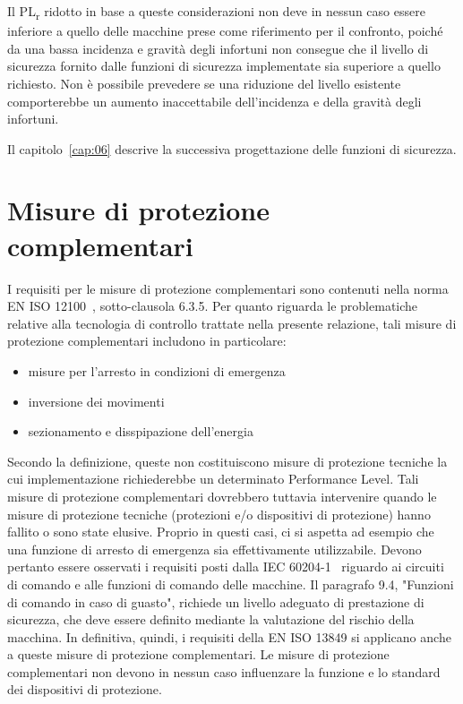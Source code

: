 Il PL\textsubscript{\small r} ridotto in base a queste considerazioni non deve in nessun caso essere inferiore a quello delle macchine prese come riferimento per il confronto, poiché da una bassa incidenza e gravità degli infortuni non consegue che il livello di sicurezza fornito dalle funzioni di sicurezza implementate sia superiore a quello richiesto. Non è possibile prevedere se una riduzione del livello esistente comporterebbe un aumento inaccettabile dell'incidenza e della gravità degli infortuni.

Il capitolo~\ref{cap:06} descrive la successiva progettazione delle funzioni di sicurezza.

\section{Misure di protezione complementari}
\label{sec:05-5}
I requisiti per le misure di protezione complementari sono contenuti nella norma EN ISO 12100~\cite{eniso12100}, sotto-clausola 6.3.5. Per quanto riguarda le problematiche relative alla tecnologia di controllo trattate nella presente relazione, tali misure di protezione complementari includono in particolare:

\begin{itemize}
    \item misure per l'arresto in condizioni di emergenza
    \item inversione dei movimenti
    \item sezionamento e disspipazione dell'energia
\end{itemize}

Secondo la definizione, queste non costituiscono misure di protezione tecniche la cui implementazione richiederebbe un determinato Performance Level. Tali misure di protezione complementari dovrebbero tuttavia intervenire quando le misure di protezione tecniche (protezioni e/o dispositivi di protezione) hanno fallito o sono state elusive. Proprio in questi casi, ci si aspetta ad esempio che una funzione di arresto di emergenza sia effettivamente utilizzabile. Devono pertanto essere osservati i requisiti posti dalla IEC 60204-1~\cite{iec60204-1} riguardo ai circuiti di comando e alle funzioni di comando delle macchine. Il paragrafo 9.4, "Funzioni di comando in caso di guasto", richiede un livello adeguato di prestazione di sicurezza, che deve essere definito mediante la valutazione del rischio della macchina. In definitiva, quindi, i requisiti della EN ISO 13849 si applicano anche a queste misure di protezione complementari. Le misure di protezione complementari non devono in nessun caso influenzare la funzione e lo standard dei dispositivi di protezione.

